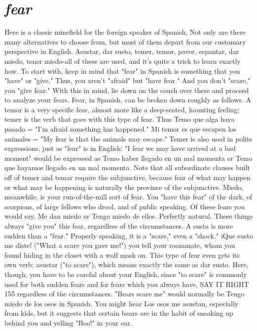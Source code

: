{{{{\section{\emph{fear}}

Here is a classic minefield for the foreign speaker of Spanish,
Not only are there many alternatives to choose from, but most of them
depart from our customary perspective in English. Asustar, dar susto,
temer, temor, pavor, espantar, dar miedo, tener miedo-all of these
are used, and it's quite a trick to learn exactly how.
To start with, keep in mind that "fear" in Spanish is something that you "have" or "give," Thus, you aren't "afraid" but "have
fear." And you don't "scare," you "give fear." With this in mind, lie
down on the couch over there and proceed to analyze your fears. Fear,
in Spanish, can be broken down roughly as follows. A temor is a very
specific fear, almost more like a deep-seated, haunting feeling; temer
is the verb that goes with this type of fear. Thus Temo que alga haya
pasado = "I'm afraid something has happened." Mi temor es que escapen los animales = "My fear is that the animals may escape." Temer
is also used in polite expressions, just as "fear" is in English: "I fear we
may have arrived at a bad moment" would be expressed as Temo haber
llegado en un mal momenta or Temo que hayamos llegado en un mal
momenta. Note that all subordinate clauses built off of temer and temar require the subjunctive, because fear of what may happen or what
may be happening is naturally the province of the subjunctive.
Miedo, meanwhile, is your run-of-the-mill sort of fear. You
"have this fear" of the dark, of scorpions, of large fellows who drool,
and of public speaking. Of these fears you would say, Me dan miedo
or Tengo miedo de ellos. Perfectly natural. These things always "give
you" this fear, regardless of the circumstances.
A susta is more sudden than a "fear." Properly speaking, it is a
"scare," even a "shock." iQue susto me diste! ("What a scare you gave
me!") you tell your roommate, whom you found hiding in the closet
with a wolf mask on. This type of fear even gets its own verb: asustar
("to scare"), which means exactly the same as dar susto. Here, though,
you have to be careful about your English, since "to scare" is commonly used for both sudden fears and for fears which you always have,
SAY IT RIGHT 155
regardless of the circumstances. "Bears scare me" would normally
be Tengo miedo de los osos in Spanish. You might hear Los osos me
asustan, especially from kids, but it suggests that certain bears are in
the habit of sneaking up behind you and yelling "Boo!" in your ear.
}}}}
